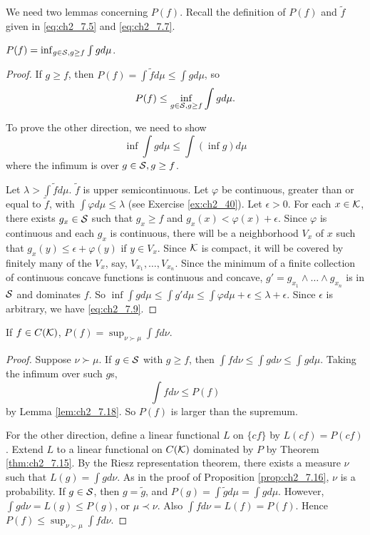 
We need two lemmas concerning $P(f)$. Recall the definition of $P(f)$ and $\widetilde{f}$ given in \eqref{eq:ch2_7.5} and \eqref{eq:ch2_7.7}.

\begin{lemma}\label{lem:ch2_7.18}
$P(f) = \inf_{g\in\mathcal{S},g\geq f} \int gd\mu$.
\end{lemma}

\begin{proof}
If $g \geq f$, then $P(f) = \int \widetilde{f}d\mu \leq \int gd\mu$, so
\[
    P(f) \leq \inf_{g\in\mathcal{S},g\geq f} \int gd\mu.
\]

To prove the other direction, we need to show
\begin{equation}\label{eq:ch2_7.9}
    \inf \int gd\mu \leq \int (\inf g)d\mu
\end{equation}
where the infimum is over $g \in \mathcal{S}, g \geq f$.

Let $\lambda > \int \widetilde{f}d\mu$. $\widetilde{f}$ is upper semicontinuous. Let $\varphi$ be continuous, greater than or equal to $\widetilde{f}$, with $\int \varphi d\mu \leq \lambda$ (see Exercise \ref{ex:ch2_40}). Let $\epsilon > 0$. For each $x \in \mathcal{K}$, there exists $g_x \in \mathcal{S}$ such that $g_x \geq f$ and $g_x(x) < \varphi(x) + \epsilon$. Since $\varphi$ is continuous and each $g_x$ is continuous, there will be a neighborhood $V_x$ of $x$ such that $g_x(y) \leq \epsilon + \varphi(y)$ if $y \in V_x$. Since $\mathcal{K}$ is compact, it will be covered by finitely many of the $V_x$, say, $V_{x_1},\ldots,V_{x_n}$. Since the minimum of a finite collection of continuous concave functions is continuous and concave, $g' = g_{x_1} \wedge \ldots \wedge g_{x_n}$ is in $\mathcal{S}$ and dominates $f$. So $\inf \int gd\mu \leq \int g'd\mu \leq \int \varphi d\mu + \epsilon \leq \lambda + \epsilon$. Since $\epsilon$ is arbitrary, we have \eqref{eq:ch2_7.9}.
\end{proof}

\begin{lemma}\label{lem:ch2_7.19}
If $f \in C(\mathcal{K})$, $P(f) = \sup_{\nu\succ\mu} \int fd\nu$.
\end{lemma}

\begin{proof}
Suppose $\nu\succ\mu$. If $g \in \mathcal{S}$ with $g \geq f$, then $\int fd\nu \leq \int gd\nu \leq \int gd\mu$. Taking the infimum over such $g$s,
\[
    \int fd\nu \leq P(f)
\]
by Lemma \ref{lem:ch2_7.18}. So $P(f)$ is larger than the supremum.

For the other direction, define a linear functional $L$ on $\{cf\}$ by $L(cf) = P(cf)$. Extend $L$ to a linear functional on $C(\mathcal{K})$ dominated by $P$ by Theorem \ref{thm:ch2_7.15}. By the Riesz representation theorem, there exists a measure $\nu$ such that $L(g) = \int gd\nu$. As in the proof of Proposition \ref{prop:ch2_7.16}, $\nu$ is a probability. If $g \in \mathcal{S}$, then $g = \widetilde{g}$, and $P(g) = \int \widetilde{g}d\mu = \int gd\mu$. However, $\int gd\nu = L(g) \leq P(g)$, or $\mu\prec\nu$. Also $\int fd\nu = L(f) = P(f)$. Hence $P(f) \leq \sup_{\nu\succ\mu} \int fd\nu$.
\end{proof}

